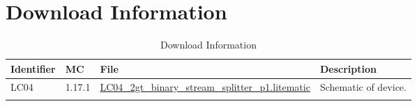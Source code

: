 \documentclass[10pt]{datasheet}
\begin{document}
\section{Download Information}
\begin{table}[h]
    \caption{Download Information}
    \begin{tabularx}{\textwidth}{l | l | l | X}
        \thickhline
        \textbf{Identifier} & \textbf{MC} & \textbf{File} & \textbf{Description} \\
        \hline
        LC04 & 1.17.1 & \href{https://github.com/Soontech-Annals/Archive/blob/8413f90a054b6c415703bae02badeba7541344f6/Archive/logic-and-computation/LC04\%202gt\%20Binary\%20Stream\%20Splitter/LC04\_2gt\_binary\_stream\_splitter\_p1.litematic?raw=1}{LC04\_2gt\_binary\_stream\_splitter\_p1.litematic} & Schematic of device. \\
        \hline
        \thickhline
    \end{tabularx}
\end{table}
\end{document}
